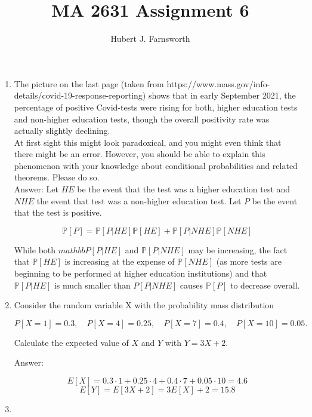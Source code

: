 \documentclass{article}
\title{MA 2631 Assignment 6}
\author{Hubert J. Farnsworth}
\begin{document}
\maketitle

\begin{enumerate}

\item

The picture on the last page (taken from
https://www.mass.gov/info-details/covid-19-response-reporting) shows that
in early September 2021, the percentage of positive Covid-tests were rising for both,
higher education tests and non-higher education tests, though the overall positivity rate
was actually slightly declining.\\

At first sight this might look paradoxical, and you might even think that there might be
an error. However, you should be able to explain this phenomenon with your knowledge
about conditional probabilities and related theorems. Please do so.\\

Answer: Let $HE$ be the event that the test was a higher education test and $NHE$ the event that test was a non-higher education test. Let $P$ be the event that the test is positive.

$$
\mathbb{P}[P] = \mathbb{P}[P | HE] \mathbb{P}[HE] + \mathbb{P}[P | NHE] \mathbb{P}[NHE]
$$

While both $mathbb{P}[P | HE]$ and $\mathbb{P}[P | NHE]$ may be increasing, the fact that $\mathbb{P}[HE]$ is increasing at the expense of $\mathbb{P}[NHE]$ (as more tests are beginning to be performed at higher education institutions) and that $\mathbb{P}[P|HE]$ is much smaller than $P[P | NHE]$ causes $\mathbb{P}[P]$ to decrease overall. 

\item

Consider the random variable X with the probability mass distribution

$$
P[X = 1] = 0.3, \quad P[X = 4] = 0.25, \quad P[X = 7] = 0.4, \quad P[X = 10] = 0.05.
$$

Calculate the expected value of $X$ and $Y$ with $Y = 3X + 2$.

Answer:

$$
E[X] = 0.3 \cdot 1 + 0.25 \cdot 4 + 0.4 \cdot 7 + 0.05 \cdot 10 = 4.6
$$
$$
E[Y] = E[3X + 2] = 3E[X] + 2 = 15.8
$$

\item


\end{enumerate}
\end{document}
